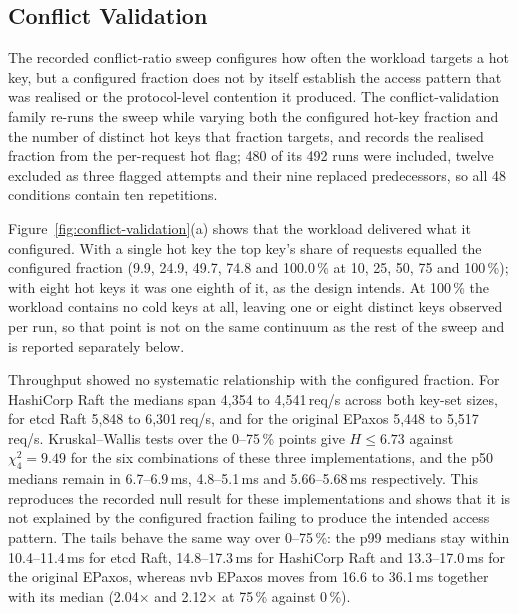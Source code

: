\subsection{Conflict Validation}

\label{sec:conflict-results}

The recorded conflict-ratio sweep configures how often the workload targets a
hot key, but a configured fraction does not by itself establish the access
pattern that was realised or the protocol-level contention it produced. The
conflict-validation family re-runs the sweep while varying both the configured
hot-key fraction and the number of distinct hot keys that fraction targets,
and records the realised fraction from the per-request hot flag; 480 of its 492
runs were included, twelve excluded as three flagged attempts and their nine
replaced predecessors, so all 48 conditions contain ten repetitions.

Figure~\ref{fig:conflict-validation}(a) shows that the workload delivered what
it configured. With a single hot key the top key's share of requests equalled
the configured fraction (9.9, 24.9, 49.7, 74.8 and 100.0\,\% at 10, 25, 50, 75
and 100\,\%); with eight hot keys it was one eighth of it, as the design
intends. At 100\,\% the workload contains no cold keys at all, leaving one or
eight distinct keys observed per run, so that point is not on the same
continuum as the rest of the sweep and is reported separately below.

Throughput showed no systematic relationship with the configured fraction.
For HashiCorp Raft the medians span 4{,}354 to 4{,}541\,req/s across both
key-set sizes, for etcd Raft 5{,}848 to 6{,}301\,req/s, and for the original
EPaxos 5{,}448 to 5{,}517\,req/s. Kruskal--Wallis tests over the 0--75\,\%
points give $H\leq6.73$ against $\chi^2_4=9.49$ for the six combinations of
these three implementations, and the p50 medians remain in 6.7--6.9\,ms,
4.8--5.1\,ms and 5.66--5.68\,ms respectively. This reproduces the recorded
null result for these implementations and shows that it is not explained
by the configured fraction failing to produce the intended access pattern.
The tails behave the same way over 0--75\,\%: the p99 medians stay within
10.4--11.4\,ms for etcd Raft, 14.8--17.3\,ms for HashiCorp Raft and
13.3--17.0\,ms for the original EPaxos, whereas nvb EPaxos moves from 16.6
to 36.1\,ms together with its median (2.04$\times$ and 2.12$\times$ at
75\,\% against 0\,\%).

